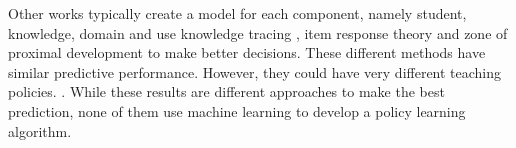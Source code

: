 Other works typically create a model for each component, namely student, knowledge, domain and use knowledge tracing \cite{corbett1994knowledge}, item response theory and zone of proximal development \cite{lord2012applications,reckase2009multidimensional,bergner2012model} to make better decisions. These different methods have similar predictive performance. However, they could have very different teaching policies. \cite{lan2016contextual}. While these results are different approaches to make the best prediction, none of them use machine learning to develop a policy learning algorithm.\par

\newlength{\savedunitlength}
\setlength{\unitlength}{2em}

\setlength{\unitlength}{\savedunitlength}